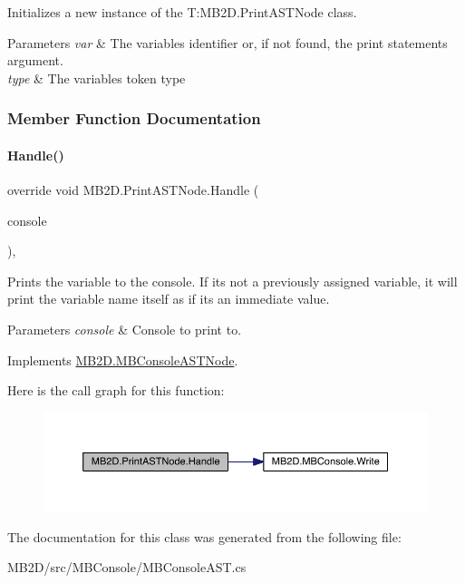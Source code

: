 Initializes a new instance of the T\+:\+M\+B2\+D.\+Print\+A\+S\+T\+Node class. 


\begin{DoxyParams}{Parameters}
{\em var} & The variables identifier or, if not found, the print statements argument. \\
\hline
{\em type} & The variables token type\\
\hline
\end{DoxyParams}


\subsubsection{Member Function Documentation}
\hypertarget{class_m_b2_d_1_1_print_a_s_t_node_a61d2408e999df07c1190f6ba8bb6ad3f}{}\label{class_m_b2_d_1_1_print_a_s_t_node_a61d2408e999df07c1190f6ba8bb6ad3f} 
\paragraph{\texorpdfstring{Handle()}{Handle()}}
{\footnotesize\ttfamily override void M\+B2\+D.\+Print\+A\+S\+T\+Node.\+Handle (\begin{DoxyParamCaption}\item[{\hyperlink{class_m_b2_d_1_1_m_b_console}{M\+B\+Console}}]{console }\end{DoxyParamCaption})\hspace{0.3cm}{\ttfamily [inline]}, {\ttfamily [virtual]}}



Prints the variable to the console. If it\textquotesingle{}s not a previously assigned variable, it will print the variable name itself as if it\textquotesingle{}s an immediate value. 


\begin{DoxyParams}{Parameters}
{\em console} & Console to print to.\\
\hline
\end{DoxyParams}


Implements \hyperlink{class_m_b2_d_1_1_m_b_console_a_s_t_node_aa70a49e61ab623698af4ed8fda4ebbf5}{M\+B2\+D.\+M\+B\+Console\+A\+S\+T\+Node}.

Here is the call graph for this function\+:
\nopagebreak
\begin{figure}[H]
\begin{center}
\leavevmode
\includegraphics[width=350pt]{class_m_b2_d_1_1_print_a_s_t_node_a61d2408e999df07c1190f6ba8bb6ad3f_cgraph}
\end{center}
\end{figure}


The documentation for this class was generated from the following file\+:\begin{DoxyCompactItemize}
\item 
M\+B2\+D/src/\+M\+B\+Console/M\+B\+Console\+A\+S\+T.\+cs\end{DoxyCompactItemize}
